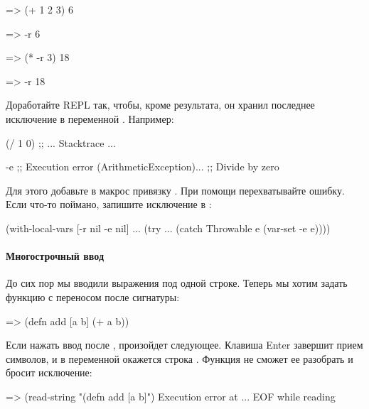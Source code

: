 \begin{english}
  \begin{clojure}
=> (+ 1 2 3)
6

=> -r
6

=> (* -r 3)
18

=> -r
18
  \end{clojure}
\end{english}

Доработайте REPL так, чтобы, кроме результата, он хранил последнее исключение в переменной . Например:

\begin{english}
  \begin{clojure}
(/ 1 0)
;; ... Stacktrace ...

-e
;; Execution error (ArithmeticException)...
;; Divide by zero
  \end{clojure}
\end{english}

Для этого добавьте в макрос  привязку \code{[... -e nil]}. При помощи  перехватывайте ошибку. Если что-то поймано, запишите исключение в :

\begin{english}
  \begin{clojure}
(with-local-vars [-r nil -e nil]
  ...
  (try
    ...
    (catch Throwable e
      (var-set -e e))))
  \end{clojure}
\end{english}

\paragraph{Многострочный ввод}

До сих пор мы вводили выражения под одной строке. Теперь мы хотим задать функцию с переносом после сигнатуры:

\begin{english}
  \begin{clojure}
=> (defn add [a b]
    (+ a b))
  \end{clojure}
\end{english}

Если нажать ввод после \code{b]}, произойдет следующее. Клавиша Enter завершит прием символов, и в переменной окажется строка . Функция  не сможет ее разобрать и бросит исключение:

\begin{english}
  \begin{clojure}
=> (read-string "(defn add [a b]")
Execution error at ...
EOF while reading
  \end{clojure}
\end{english}

